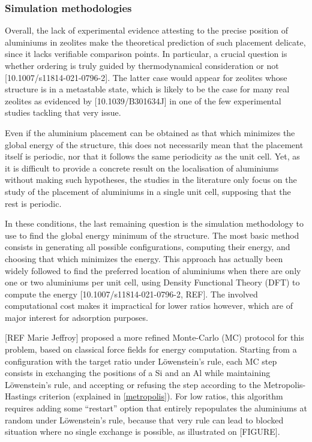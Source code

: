 \documentclass[main.tex]{subfiles}
\begin{document}
\subsubsection{Simulation methodologies}

Overall, the lack of experimental evidence attesting to the precise position of aluminiums in zeolites make the theoretical prediction of such placement delicate, since it lacks verifiable comparison points. In particular, a crucial question is whether \SiAl ordering is truly guided by thermodynamical consideration or not [10.1007/s11814-021-0796-2]. The latter case would appear for zeolites whose structure is in a metastable state, which is likely to be the case for many real zeolites as evidenced by [10.1039/B301634J] in one of the few experimental studies tackling that very issue.

Even if the aluminium placement can be obtained as that which minimizes the global energy of the structure, this does not necessarily mean that the placement itself is periodic, nor that it follows the same periodicity as the unit cell. Yet, as it is difficult to provide a concrete result on the localisation of aluminiums without making such hypotheses, the studies in the literature only focus on the study of the placement of aluminiums in a single unit cell, supposing that the rest is periodic.

In these conditions, the last remaining question is the simulation methodology to use to find the global energy minimum of the structure. The most basic method consists in generating all possible configurations, computing their energy, and choosing that which minimizes the energy. This approach has actually been widely followed to find the preferred location of aluminiums when there are only one or two aluminiums per unit cell, using Density Functional Theory (DFT) to compute the energy [10.1007/s11814-021-0796-2, REF]. The involved computational cost makes it impractical for lower \SiAl ratios however, which are of major interest for adsorption purposes.

[REF Marie Jeffroy]\label{mariejeffroy_al} proposed a more refined Monte-Carlo (MC) protocol for this problem, based on classical force fields for energy computation. Starting from a configuration with the target \SiAl ratio under L\"owenstein's rule, each MC step consists in exchanging the positions of a Si and an Al while maintaining L\"owenstein's rule, and accepting or refusing the step according to the Metropolis-Hastings criterion (explained in \autoref{metropolis}). For low \SiAl ratios, this algorithm requires adding some ``restart'' option that entirely repopulates the aluminiums at random under L\"owenstein's rule, because that very rule can lead to blocked situation where no single \SiAl exchange is possible, as illustrated on [FIGURE].
\end{document}
